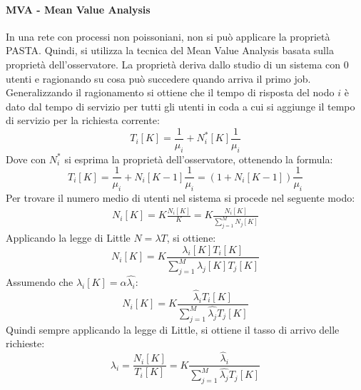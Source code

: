 \documentclass{article}
\begin{document}
\paragraph{MVA - Mean Value Analysis}
In una rete con processi non poissoniani, non si può applicare la proprietà PASTA. Quindi,
si utilizza la tecnica del Mean Value Analysis basata sulla proprietà dell'osservatore. 
La proprietà deriva dallo studio di un sistema con $0$ utenti e ragionando su cosa può
succedere quando arriva il primo job. Generalizzando il ragionamento si ottiene che il 
tempo di risposta del nodo $i$ è dato dal tempo di servizio per tutti gli utenti in coda a 
cui si aggiunge il tempo di servizio per la richiesta corrente:
\[
  T_i[K] = \frac{1}{\mu_i} + N^*_i[K]\frac{1}{\mu_i}
\]
Dove con $N^*_i$ si esprima la proprietà dell'osservatore, ottenendo la formula:
\[
  T_i[K] = \frac{1}{\mu_i} + N_i[K-1]\frac{1}{\mu_i} = (1+N_i[K-1]) \frac{1}{\mu_i}
\]
Per trovare il numero medio di utenti nel sistema si procede nel seguente modo:
\begin{align*}
  N_i[K] = K\frac{N_i[K]}{K} = K \frac{N_i[K]}{\sum_{j=1}^M N_j[K]}
\end{align*}
Applicando la legge di Little $N = \lambda T$, si ottiene:
\[
  N_i[K] = K \frac{\lambda_i[K]T_i[K]}{\sum_{j=1}^M \lambda_j[K]T_j[K]}
\]
Assumendo che  $\lambda_i[K] = \alpha\hat{\lambda_i}$:
\[
  N_i[K] = K \frac{\hat{\lambda}_iT_i[K]}{\sum_{j=1}^M \hat{\lambda_j}T_j[K]}
\]
Quindi sempre applicando la legge di Little, si ottiene il tasso di arrivo delle richieste:
\[
  \lambda_i = \frac{N_i[K]}{T_i[K]} = K \frac{\hat{\lambda}_i}{\sum_{j=1}^M \hat{\lambda_j}T_j[K]}
\]
\clearpage
\end{document}
